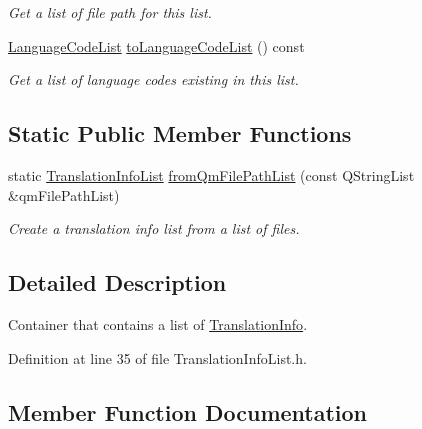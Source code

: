 \begin{DoxyCompactItemize}
\begin{DoxyCompactList}\small\item\em Get a list of file path for this list. \end{DoxyCompactList}\item 
\hyperlink{class_mdt_1_1_translation_1_1_language_code_list}{Language\+Code\+List} \hyperlink{class_mdt_1_1_translation_1_1_translation_info_list_ad4c3e0e633f3d35a21572eed3ca4ccec}{to\+Language\+Code\+List} () const \hypertarget{class_mdt_1_1_translation_1_1_translation_info_list_ad4c3e0e633f3d35a21572eed3ca4ccec}{}\label{class_mdt_1_1_translation_1_1_translation_info_list_ad4c3e0e633f3d35a21572eed3ca4ccec}

\begin{DoxyCompactList}\small\item\em Get a list of language codes existing in this list. \end{DoxyCompactList}\end{DoxyCompactItemize}
\subsection*{Static Public Member Functions}
\begin{DoxyCompactItemize}
\item 
static \hyperlink{class_mdt_1_1_translation_1_1_translation_info_list}{Translation\+Info\+List} \hyperlink{class_mdt_1_1_translation_1_1_translation_info_list_ac1fb4d2fc5c60bfcefa181022ce924cc}{from\+Qm\+File\+Path\+List} (const Q\+String\+List \&qm\+File\+Path\+List)
\begin{DoxyCompactList}\small\item\em Create a translation info list from a list of files. \end{DoxyCompactList}\end{DoxyCompactItemize}


\subsection{Detailed Description}
Container that contains a list of \hyperlink{class_mdt_1_1_translation_1_1_translation_info}{Translation\+Info}. 

Definition at line 35 of file Translation\+Info\+List.\+h.



\subsection{Member Function Documentation}
